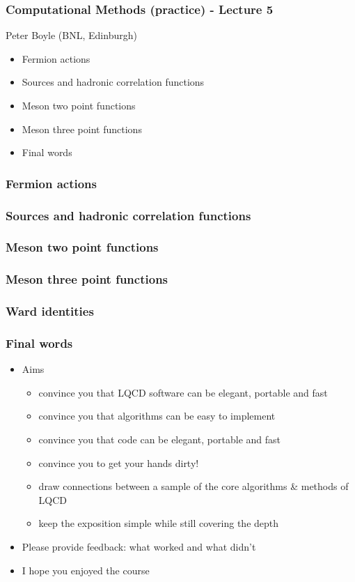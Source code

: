 \documentclass[pdf,ps,8pt]{beamer}
\begin{document}
\begin{frame}[fragile]\small\frametitle{  Computational Methods (practice) -  Lecture 5    }

  \begin{center}
 
  {\color{red} Peter Boyle} (BNL, Edinburgh)

  \begin{itemize}
  \item Fermion actions 
  \item Sources and hadronic correlation functions
  \item Meson two point functions
  \item Meson three point functions
  \item Final words
  \end{itemize}

\end{center}  

\end{frame}

\begin{frame}[fragile]\small\frametitle{ Fermion actions }
\end{frame}

\begin{frame}[fragile]\small\frametitle{ Sources and hadronic correlation functions }
\end{frame}

\begin{frame}[fragile]\small\frametitle{ Meson two point functions }
\end{frame}

\begin{frame}[fragile]\small\frametitle{ Meson three point functions }
\end{frame}

\begin{frame}[fragile]\small\frametitle{ Ward identities }
\end{frame}

\begin{frame}[fragile]\small\frametitle{ Final words }
  \begin{itemize}
  \item Aims
  \begin{itemize}
  \item convince you that LQCD software can be elegant, portable and fast
  \item convince you that algorithms can be easy to implement
  \item convince you that code can be elegant, portable and fast
  \item convince you to get your hands dirty!
  \item draw connections between a sample of the core algorithms \& methods of LQCD
  \item keep the exposition simple while still covering the depth
  \end{itemize}
  \item Please provide feedback: what worked and what didn't
  \item I hope you enjoyed the course
  \end{itemize}
\end{frame}
\end{document}

